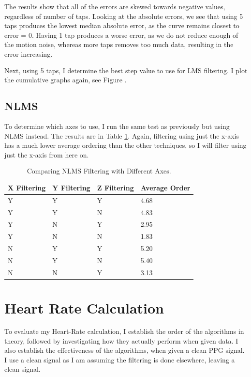 \documentclass[12pt,a4paper,twoside,openright]{report}
\begin{document}
The results show that all of the errors are skewed towards negative values,
regardless of number of taps. Looking at the absolute errors, we see that
using 5 taps produces the lowest median absolute error, as the curve remains
closest to error = 0. Having 1 tap produces a worse error, as we do not reduce
enough of the motion noise, whereas more taps removes too much data, resulting
in the error increasing.

Next, using 5 taps, I determine the best step value to use for LMS filtering.
I plot the cumulative graphs again, see Figure .

\subsection{NLMS}

To determine which axes to use, I run the same test as previously but using
NLMS instead. The results are in Table \ref{table:nlms-errors}. Again,
filtering using just the x-axis has a much lower average ordering than the
other techniques, so I will filter using just the x-axis from here on.

\begin{table}[]
\centering
\caption{Comparing NLMS Filtering with Different Axes.}
\label{table:nlms-errors}
\begin{tabular}{|l|l|l|l|}
\hline
X Filtering & Y Filtering & Z Filtering & Average Order \\ \hline
Y           & Y           & Y           & 4.68          \\
Y           & Y           & N           & 4.83          \\
Y           & N           & Y           & 2.95          \\
Y           & N           & N           & 1.83          \\
N           & Y           & Y           & 5.20          \\
N           & Y           & N           & 5.40          \\
N           & N           & Y           & 3.13          \\
\hline
\end{tabular}
\end{table}

\section{Heart Rate Calculation}

To evaluate my Heart-Rate calculation, I establish the order of the algorithms
in theory, followed by investigating how they actually perform when given
data. I also establish the effectiveness of the algorithms, when given a clean
PPG signal. I use a clean signal as I am assuming the filtering is done
elsewhere, leaving a clean signal.
\end{document}

